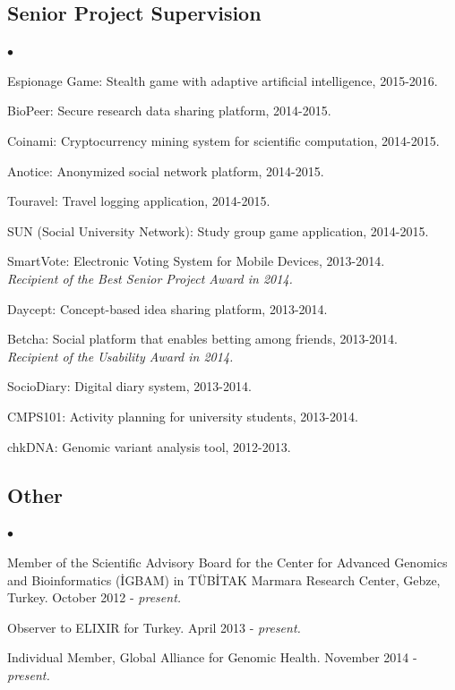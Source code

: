 \documentclass[margin,line]{res}
\newenvironment{list2}{
  \begin{list}{$\bullet$}{%
      \setlength{\itemsep}{0in}
      \setlength{\parsep}{0in} \setlength{\parskip}{0in}
      \setlength{\topsep}{0in} \setlength{\partopsep}{0in} 
      \setlength{\leftmargin}{0.2in}}}{\end{list}}
\begin{document}
\begin{resume}
\vspace{-0.6cm}
\subsection{\small \sc Senior Project Supervision}
\begin{list2}
  \item Espionage Game: Stealth game with adaptive artificial intelligence, 2015-2016.
  \item BioPeer: Secure research data sharing platform, 2014-2015.
  \item Coinami: Cryptocurrency mining system for scientific computation, 2014-2015.
  \item Anotice: Anonymized social network platform, 2014-2015.
  \item Touravel: Travel logging application, 2014-2015. 
  \item SUN (Social University Network): Study group game application, 2014-2015.
  \item SmartVote: Electronic Voting System for Mobile Devices, 2013-2014. \\
    {\it Recipient of the Best Senior Project Award in 2014.}
  \item Daycept: Concept-based idea sharing platform, 2013-2014.
  \item Betcha: Social platform that enables betting among friends, 2013-2014.\\
    {\it Recipient of the Usability Award in 2014.}
  \item SocioDiary: Digital diary system, 2013-2014.
  \item CMPS101: Activity planning for university students, 2013-2014.
  \item chkDNA: Genomic variant analysis tool, 2012-2013.
\end{list2}



\vspace{-0.6cm}
\subsection{\small \sc Other}
\begin{list2}
\item
  Member of the Scientific Advisory Board for the Center for Advanced Genomics and Bioinformatics (\.{I}GBAM)
  in T\"{U}B\.{I}TAK Marmara Research Center, Gebze, Turkey. October 2012 - {\it present.}
\item
  Observer to ELIXIR for Turkey. April 2013 - {\it present.}
\item
  Individual Member, Global Alliance for Genomic Health. November 2014 - {\it present.}
\end{list2}



\end{resume}
\end{document}
